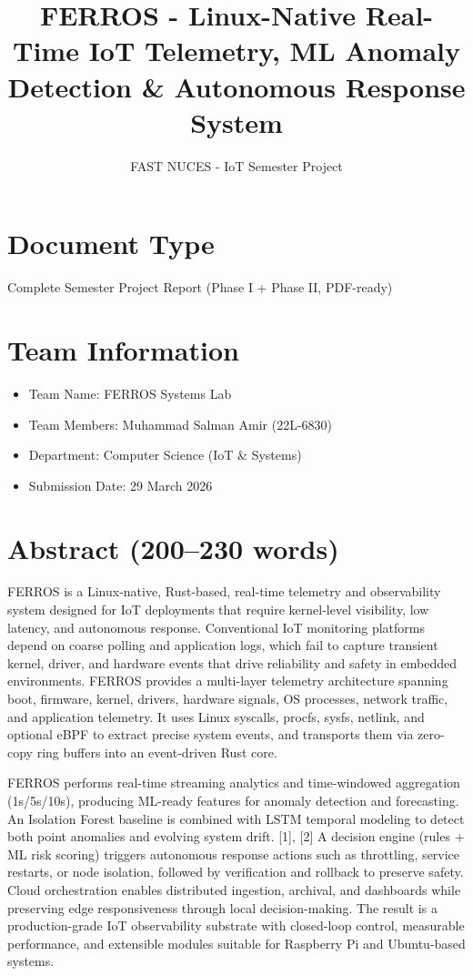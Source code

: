\documentclass[11pt]{article}
\title{FERROS - Linux-Native Real-Time IoT Telemetry, ML Anomaly Detection \& Autonomous Response System}
\author{FAST NUCES - IoT Semester Project}
\date{}
\begin{document}
\maketitle

\section*{Document Type}
Complete Semester Project Report (Phase I + Phase II, PDF-ready)

\section*{Team Information}
\begin{itemize}
    \item Team Name: FERROS Systems Lab
    \item Team Members: Muhammad Salman Amir (22L-6830)
    \item Department: Computer Science (IoT \& Systems)
    \item Submission Date: 29 March 2026
\end{itemize}

\section*{Abstract (200--230 words)}
FERROS is a Linux-native, Rust-based, real-time telemetry and observability system designed for IoT deployments that require kernel-level visibility, low latency, and autonomous response. Conventional IoT monitoring platforms depend on coarse polling and application logs, which fail to capture transient kernel, driver, and hardware events that drive reliability and safety in embedded environments. FERROS provides a multi-layer telemetry architecture spanning boot, firmware, kernel, drivers, hardware signals, OS processes, network traffic, and application telemetry. It uses Linux syscalls, procfs, sysfs, netlink, and optional eBPF to extract precise system events, and transports them via zero-copy ring buffers into an event-driven Rust core.

FERROS performs real-time streaming analytics and time-windowed aggregation (1s/5s/10s), producing ML-ready features for anomaly detection and forecasting. An Isolation Forest baseline is combined with LSTM temporal modeling to detect both point anomalies and evolving system drift. [1], [2] A decision engine (rules + ML risk scoring) triggers autonomous response actions such as throttling, service restarts, or node isolation, followed by verification and rollback to preserve safety. Cloud orchestration enables distributed ingestion, archival, and dashboards while preserving edge responsiveness through local decision-making. The result is a production-grade IoT observability substrate with closed-loop control, measurable performance, and extensible modules suitable for Raspberry Pi and Ubuntu-based systems.
\end{document}
